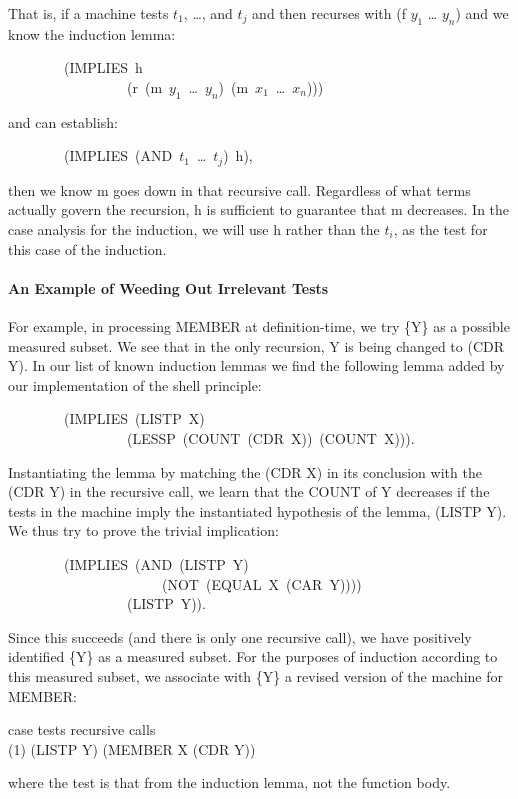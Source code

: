 \documentclass[10pt]{book}
\newenvironment{pubasis}{\begin{flushleft}}{\end{flushleft}}
\begin{document}
That is, if a machine tests $t_{1}$, \ldots{}, and $t_{j}$ and then recurses
with (f $y_{1}$ \ldots{} $y_{n}$) and we know the induction lemma:
\begin{pubasis}
~~~~~~~~(IMPLIES~h\\
~~~~~~~~~~~~~~~~~(r~(m~$y_{1}$~\ldots{}~$y_{n}$)~(m~$x_{1}$~\ldots{}~$x_{n}$)))\\
\end{pubasis}
and can establish:
\begin{pubasis}
~~~~~~~~(IMPLIES~(AND~$t_{1}$~\ldots{}~$t_{j}$)~h),\\
\end{pubasis}
then we know m goes down in that recursive call.  Regardless of what
terms actually govern the recursion, h is sufficient to guarantee
that m decreases.  In the
case analysis for the induction, we will use h rather than the $t_{i}$,
as the test for this case of the induction.

\paragraph{An Example of Weeding Out Irrelevant Tests}
For example, in processing MEMBER at definition-time, we try \{Y\} as a
possible measured subset.  We see that in the only recursion, Y is
being changed to (CDR Y).  In our list of
known induction lemmas we find the following lemma added by our
implementation of the shell principle:

\begin{pubasis}
~~~~~~~~(IMPLIES~(LISTP~X)\\
~~~~~~~~~~~~~~~~~(LESSP~(COUNT~(CDR~X))~(COUNT~X))).\\
\end{pubasis}
Instantiating the lemma by matching the (CDR X) in its conclusion
with the (CDR Y) in the recursive call, we  learn that the
COUNT of Y decreases if the tests in the machine imply
the instantiated hypothesis of the lemma,  (LISTP Y).
We thus try to prove the trivial implication:
\begin{pubasis}
~~~~~~~~(IMPLIES~(AND~(LISTP~Y)\\
~~~~~~~~~~~~~~~~~~~~~~(NOT~(EQUAL~X~(CAR~Y))))\\
~~~~~~~~~~~~~~~~~(LISTP~Y)).\\
\end{pubasis}
Since this succeeds (and there is only one recursive call), we 
have positively identified \{Y\} as a measured subset.
For the purposes of induction according to this measured subset,
we associate with \{Y\} a revised version of the machine for MEMBER:
\begin{pubasis}
case	   tests		recursive calls\\

(1)	(LISTP Y)		(MEMBER X (CDR Y))\\
\end{pubasis}
where the test is that from the induction lemma, not the function body.
\end{document}
